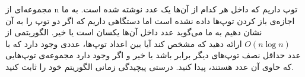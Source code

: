 مجموعه‌ای از n توپ داریم که داخل هر کدام از آن‌ها یک عدد نوشته شده است. به ما اجازه‌ی باز کردن توپ‌ها داده نشده است اما دستگاهی داریم که اگر دو توپ را به آن نشان دهیم به ما می‌گوید عدد داخل آن‌ها یکسان است یا خیر. الگوریتمی از $O(n\log n)$ ارائه دهید که مشخص کند آیا بین اعداد توپ‌ها، عددی وجود دارد که با عدد حداقل نصف تو‌پ‌های دیگر برابر باشد یا خير و اگر وجود دارد مجموعه‌‌ی توپ‌هایی که حاوی آن عدد هستند، پیدا کنید. درستی پیچیدگی زمانی الگوریتم خود را ثابت کنید.
